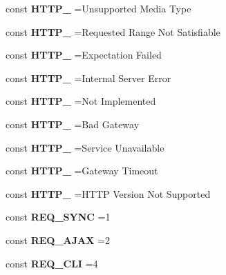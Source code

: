 \begin{DoxyCompactItemize}
\item 
\hypertarget{class_base_a5d89cd8370f685b1f3e6e269687adc45}{}\label{class_base_a5d89cd8370f685b1f3e6e269687adc45} 
const {\bfseries H\+T\+T\+P\+\_} =\textquotesingle{}Unsupported Media Type\textquotesingle{}
\item 
\hypertarget{class_base_a38e6c727e49a57b0d54d558ee6c42577}{}\label{class_base_a38e6c727e49a57b0d54d558ee6c42577} 
const {\bfseries H\+T\+T\+P\+\_} =\textquotesingle{}Requested Range Not Satisfiable\textquotesingle{}
\item 
\hypertarget{class_base_adad1d3f1ac9914076661124ac1125344}{}\label{class_base_adad1d3f1ac9914076661124ac1125344} 
const {\bfseries H\+T\+T\+P\+\_} =\textquotesingle{}Expectation Failed\textquotesingle{}
\item 
\hypertarget{class_base_a33889bdfdb2d12c842493341cd16851b}{}\label{class_base_a33889bdfdb2d12c842493341cd16851b} 
const {\bfseries H\+T\+T\+P\+\_} =\textquotesingle{}Internal Server Error\textquotesingle{}
\item 
\hypertarget{class_base_a87cea373c6e56aaf7a228e510ba556ae}{}\label{class_base_a87cea373c6e56aaf7a228e510ba556ae} 
const {\bfseries H\+T\+T\+P\+\_} =\textquotesingle{}Not Implemented\textquotesingle{}
\item 
\hypertarget{class_base_ad1700a5a37fbd79890aefad7ce0cb498}{}\label{class_base_ad1700a5a37fbd79890aefad7ce0cb498} 
const {\bfseries H\+T\+T\+P\+\_} =\textquotesingle{}Bad Gateway\textquotesingle{}
\item 
\hypertarget{class_base_a8646dd1cbc680e1bf771241e82a0a701}{}\label{class_base_a8646dd1cbc680e1bf771241e82a0a701} 
const {\bfseries H\+T\+T\+P\+\_} =\textquotesingle{}Service Unavailable\textquotesingle{}
\item 
\hypertarget{class_base_ad02fdd88ce4a4f595f8302e2e7e2fec3}{}\label{class_base_ad02fdd88ce4a4f595f8302e2e7e2fec3} 
const {\bfseries H\+T\+T\+P\+\_} =\textquotesingle{}Gateway Timeout\textquotesingle{}
\item 
\hypertarget{class_base_ae2b559dd27bdc2459d58581ed4289275}{}\label{class_base_ae2b559dd27bdc2459d58581ed4289275} 
const {\bfseries H\+T\+T\+P\+\_} =\textquotesingle{}H\+T\+TP Version Not Supported\textquotesingle{}
\end{DoxyCompactItemize}

{\bf }\par
\begin{DoxyCompactItemize}
\item 
\hypertarget{class_base_acc82b22baa60bf2d2a558f73b83b01b7}{}\label{class_base_acc82b22baa60bf2d2a558f73b83b01b7} 
const {\bfseries R\+E\+Q\+\_\+\+S\+Y\+NC} =1
\item 
\hypertarget{class_base_a0d45704345cefda5b42533a00b8f02a7}{}\label{class_base_a0d45704345cefda5b42533a00b8f02a7} 
const {\bfseries R\+E\+Q\+\_\+\+A\+J\+AX} =2
\item 
\hypertarget{class_base_a1662b755d7828c7beb5dd2f5461ae3bc}{}\label{class_base_a1662b755d7828c7beb5dd2f5461ae3bc} 
const {\bfseries R\+E\+Q\+\_\+\+C\+LI} =4
\end{DoxyCompactItemize}

